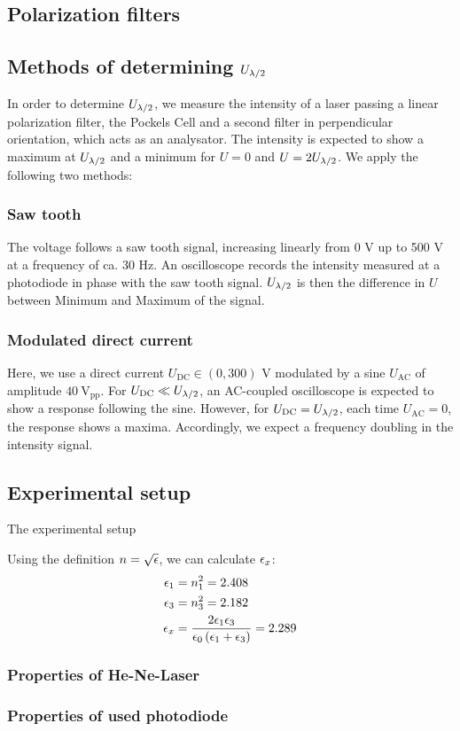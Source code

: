 \subsection{Polarization filters}

\subsection{Methods of determining $U_{\lambda/2}$}
In order to determine $U_{\lambda/2}$, we measure the intensity of a laser 
passing a linear polarization filter, the Pockels Cell and a second filter 
in perpendicular orientation, 
which acts as an analysator. The intensity is expected to show a maximum at 
$U_{\lambda/2}$ and a minimum for $U = 0$ and $U = 2U_{\lambda/2}$. We apply the following two methods:
\subsubsection{Saw tooth}
The voltage follows a saw tooth signal, increasing linearly from 0 V up to 500 V 
at a frequency of ca. 30 Hz. An oscilloscope records the intensity measured 
at a photodiode in phase with the saw tooth signal. $U_{\lambda/2}$ is then the difference 
in $U$ between Minimum and Maximum of the signal. 
\subsubsection{Modulated direct current}
Here, we use a direct current $U_\mathrm{DC} \in (0, 300)$ V modulated by a 
sine $U_\mathrm{AC}$ of amplitude $40 \ \mathrm{V_{pp}}$. 
For $U_\mathrm{DC} \ll U_{\lambda/2}$, an AC-coupled 
oscilloscope is expected to show a response following the sine. However, for 
$U_\mathrm{DC} = U_{\lambda/2}$, each time $U_\mathrm{AC} = 0$, the response shows a maxima. 
Accordingly, we expect a frequency doubling in the intensity signal. 

\subsection{Experimental setup}
The experimental setup



Using the definition $n = \sqrt{\epsilon}$, we can calculate $\epsilon_x$:
\begin{align}
    \epsilon_1 &= n_1^2 = 2.408 \\
    \epsilon_3 &= n_3^2 = 2.182 \\
    \epsilon_x &= \frac{2 \epsilon_1 \epsilon_3}{\epsilon_0 \left( \epsilon_1 + \epsilon_3\right)} = 2.289
\end{align}


\subsubsection{Properties of He-Ne-Laser}
\subsubsection{Properties of used photodiode}


